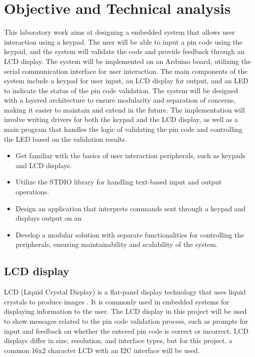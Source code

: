 \newpage

\tableofcontents

\newpage

\section{Objective and Technical analysis}

This laboratory work aims at designing a embedded system that allows user interaction using a keypad. The user will be able to input a pin code using the keypad, and the system will validate the code and provide feedback through an LCD display. The system will be implemented on an Arduino board, utilizing the serial communication interface for user interaction. The main components of the system include a keypad for user input, an LCD display for output, and an LED to indicate the status of the pin code validation. The system will be designed with a layered architecture to ensure modularity and separation of concerns, making it easier to maintain and extend in the future. The implementation will involve writing drivers for both the keypad and the LCD display, as well as a main program that handles the logic of validating the pin code and controlling the LED based on the validation results.

\begin{itemize}
    \item Get familiar with the basics of user interaction peripherals, such as keypads and LCD displays.
    \item Utilize the STDIO library for handling text-based input and output operations.
    \item Design an application that interprets commands sent through a keypad and displays output on an
    \item Develop a modular solution with separate functionalities for controlling the peripherals, ensuring maintainability and scalability of the system.
\end{itemize}

\subsection{LCD display}

LCD (Liquid Crystal Display) is a flat-panel display technology that uses liquid crystals to produce images \cite{lcd}. It is commonly used in embedded systems for displaying information to the user. The LCD display in this project will be used to show messages related to the pin code validation process, such as prompts for input and feedback on whether the entered pin code is correct or incorrect. LCD displays differ in size, resolution, and interface types, but for this project, a common 16x2 character LCD with an I2C interface will be used. 

